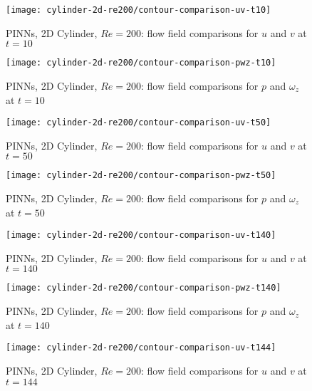 \begin{figure}[hbt!]
    \texttt{[image: cylinder-2d-re200/contour-comparison-uv-t10]}
    \caption{PINNs, 2D Cylinder, $Re=200$: flow field comparisons for $u$ and $v$ at $t=10$}
    \label{fig:cylinder-re200-contour-uv-t10}
\end{figure}

\begin{figure}[hbt!]
    \texttt{[image: cylinder-2d-re200/contour-comparison-pwz-t10]}
    \caption{PINNs, 2D Cylinder, $Re=200$: flow field comparisons for $p$ and $\omega_z$ at $t=10$}
    \label{fig:cylinder-re200-contour-pwz-t10}
\end{figure}

\begin{figure}[hbt!]
    \texttt{[image: cylinder-2d-re200/contour-comparison-uv-t50]}
    \caption{PINNs, 2D Cylinder, $Re=200$: flow field comparisons for $u$ and $v$ at $t=50$}
    \label{fig:cylinder-re200-contour-uv-t50}
\end{figure}

\begin{figure}[hbt!]
    \texttt{[image: cylinder-2d-re200/contour-comparison-pwz-t50]}
    \caption{PINNs, 2D Cylinder, $Re=200$: flow field comparisons for $p$ and $\omega_z$ at $t=50$}
    \label{fig:cylinder-re200-contour-pwz-t50}
\end{figure}

\begin{figure}[hbt!]
    \texttt{[image: cylinder-2d-re200/contour-comparison-uv-t140]}
    \caption{PINNs, 2D Cylinder, $Re=200$: flow field comparisons for $u$ and $v$ at $t=140$}
    \label{fig:cylinder-re200-contour-uv-t140}
\end{figure}

\begin{figure}[hbt!]
    \texttt{[image: cylinder-2d-re200/contour-comparison-pwz-t140]}
    \caption{PINNs, 2D Cylinder, $Re=200$: flow field comparisons for $p$ and $\omega_z$ at $t=140$}
    \label{fig:cylinder-re200-contour-pwz-t140}
\end{figure}

\begin{figure}[hbt!]
    \texttt{[image: cylinder-2d-re200/contour-comparison-uv-t144]}
    \caption{PINNs, 2D Cylinder, $Re=200$: flow field comparisons for $u$ and $v$ at $t=144$}
    \label{fig:cylinder-re200-contour-uv-t144}
\end{figure}

